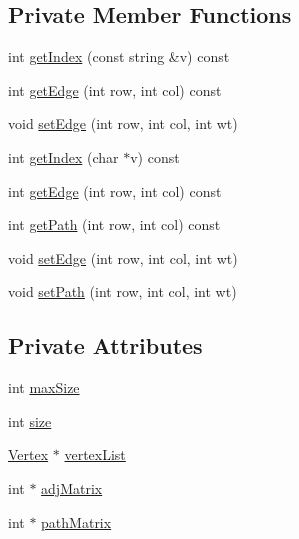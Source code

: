 \subsection*{\-Private \-Member \-Functions}
\begin{DoxyCompactItemize}
\item 
int \hyperlink{class_weighted_graph_a0c6d1c040128d1818ab3b38ff72723a4}{get\-Index} (const string \&v) const 
\item 
int \hyperlink{class_weighted_graph_aeda0f97771058c4ca642432cef88f52e}{get\-Edge} (int row, int col) const 
\item 
void \hyperlink{class_weighted_graph_aca51b1a746202621345709290a0ddd98}{set\-Edge} (int row, int col, int wt)
\item 
int \hyperlink{class_weighted_graph_ababe06235c182b7e5278fcf4a627e143}{get\-Index} (char $\ast$v) const 
\item 
int \hyperlink{class_weighted_graph_aeda0f97771058c4ca642432cef88f52e}{get\-Edge} (int row, int col) const 
\item 
int \hyperlink{class_weighted_graph_a878188104e22c8ec0960d723ef4f58d9}{get\-Path} (int row, int col) const 
\item 
void \hyperlink{class_weighted_graph_aca51b1a746202621345709290a0ddd98}{set\-Edge} (int row, int col, int wt)
\item 
void \hyperlink{class_weighted_graph_a7872c78e6db2c55fc064b121303bb9d4}{set\-Path} (int row, int col, int wt)
\end{DoxyCompactItemize}
\subsection*{\-Private \-Attributes}
\begin{DoxyCompactItemize}
\item 
int \hyperlink{class_weighted_graph_ae8cd4e7b91702a470e59472979e94cb5}{max\-Size}
\item 
int \hyperlink{class_weighted_graph_a4452835ad9619580ff968a4d6a9cfe44}{size}
\item 
\hyperlink{class_weighted_graph_1_1_vertex}{\-Vertex} $\ast$ \hyperlink{class_weighted_graph_a2ad6c13bc100655ac45c6d97619bfb49}{vertex\-List}
\item 
int $\ast$ \hyperlink{class_weighted_graph_a7d7bdb83dbcfe0b7518db650e293b94f}{adj\-Matrix}
\item 
int $\ast$ \hyperlink{class_weighted_graph_a2bdcff3d3f13972f28e38a14957fcc34}{path\-Matrix}
\end{DoxyCompactItemize}


